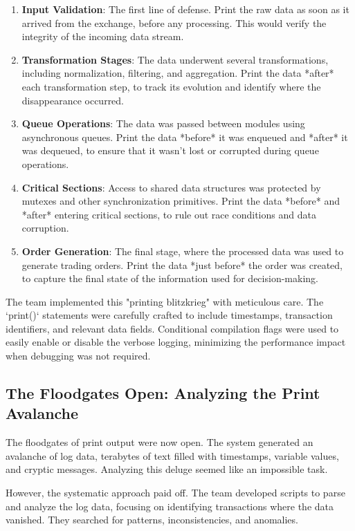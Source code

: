 \documentclass{article}
\begin{document}
{{{{\begin{enumerate}
    \item \textbf{Input Validation}: The first line of defense. Print the raw data as soon as it arrived from the exchange, before any processing. This would verify the integrity of the incoming data stream.
    \item \textbf{Transformation Stages}: The data underwent several transformations, including normalization, filtering, and aggregation. Print the data *after* each transformation step, to track its evolution and identify where the disappearance occurred.
    \item \textbf{Queue Operations}: The data was passed between modules using asynchronous queues. Print the data *before* it was enqueued and *after* it was dequeued, to ensure that it wasn't lost or corrupted during queue operations.
    \item \textbf{Critical Sections}: Access to shared data structures was protected by mutexes and other synchronization primitives. Print the data *before* and *after* entering critical sections, to rule out race conditions and data corruption.
    \item \textbf{Order Generation}: The final stage, where the processed data was used to generate trading orders. Print the data *just before* the order was created, to capture the final state of the information used for decision-making.
\end{enumerate}

The team implemented this "printing blitzkrieg" with meticulous care. The `print()` statements were carefully crafted to include timestamps, transaction identifiers, and relevant data fields. Conditional compilation flags were used to easily enable or disable the verbose logging, minimizing the performance impact when debugging was not required.

\subsection*{The Floodgates Open: Analyzing the Print Avalanche}

The floodgates of print output were now open. The system generated an avalanche of log data, terabytes of text filled with timestamps, variable values, and cryptic messages. Analyzing this deluge seemed like an impossible task.

However, the systematic approach paid off. The team developed scripts to parse and analyze the log data, focusing on identifying transactions where the data vanished. They searched for patterns, inconsistencies, and anomalies.

}}}}
\end{document}
